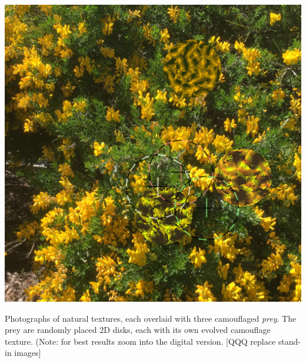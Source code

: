 \documentclass[sigconf]{acmart}
\begin{document}
\begin{teaserfigure}
    \includegraphics[scale=0.24]{images/20220930_step_6093.png}
    \caption{Photographs of natural textures, each overlaid with three camouflaged \textit{prey}. The prey are randomly placed 2D disks, each with its own evolved camouflage texture. (Note: for best results zoom into the digital version. [QQQ replace stand-in images]}
    \label{fig:teaser}
    \vspace{3mm} %
\end{teaserfigure}

\maketitle

\end{document}
